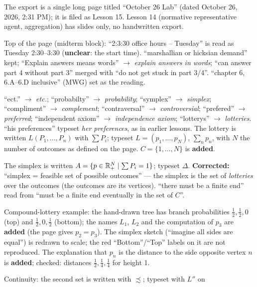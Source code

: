 \documentclass[11pt]{article}
\begin{document}
\begin{transcriptnotes}
  \item The export is a single long page titled ``October 26 Lab'' (dated October 26,
        2026, 2:31 PM); it is filed as Lesson 15. Lesson 14 (normative representative
        agent, aggregation) has slides only, no handwritten export.
  \item Top of the page (midterm block): ``2:3:30 office hours -- Tuesday'' is read as
        Tuesday 2:30--3:30 (\textbf{unclear}: the start time). ``marshallian or
        hicksian demand'' kept; ``Explain answers means words'' $\to$ \emph{explain
        answers in words}; ``can answer part 4 without part 3'' merged with ``do not
        get stuck in part 3/4''. ``chapter 6, 6.A--6.D inclusive'' (MWG) set as the
        reading.
  \item ``ect.'' $\to$ \emph{etc.}; ``probabilty'' $\to$ \emph{probability};
        ``symplex'' $\to$ \emph{simplex}; ``compliment'' $\to$ \emph{complement};
        ``contraversal'' $\to$ \emph{controversial}; ``prefered'' $\to$
        \emph{preferred}; ``independent axiom'' $\to$ \emph{independence axiom};
        ``lotterys'' $\to$ \emph{lotteries}. ``his preferences'' typeset
        \emph{her preferences}, as in earlier lessons. The lottery is written
        $L(P_1,\dots,P_n)$ with $\sum P_i$; typeset $L=(p_1,\dots,p_N)$, $\sum_n p_n$,
        with $N$ the number of outcomes as defined on the page. $C=\{1,\dots,N\}$ is
        \textbf{added}.
  \item The simplex is written $A=\{p\in\mathbb{R}^N_+\mid\sum P_i=1\}$; typeset $\Delta$.
        \textbf{Corrected:} ``simplex = feasible set of possible outcomes'' --- the
        simplex is the set of \emph{lotteries} over the outcomes (the outcomes are its
        vertices). ``there must be a finite end'' read from ``must be a finite end
        eventually in the set of $C$''.
  \item Compound-lottery example: the hand-drawn tree has branch probabilities
        $\tfrac12,\tfrac12,0$ (top) and $\tfrac12,0,\tfrac12$ (bottom); the names
        $L_1$, $L_2$ and the computation of $p_3$ are \textbf{added} (the page gives
        $p_2=p_3$). The simplex sketch (``imagine all sides are equal'') is redrawn to
        scale; the red ``Bottom''/``Top'' labels on it are not reproduced. The
        explanation that $p_n$ is the distance to the side opposite vertex $n$ is
        \textbf{added}; checked: distances $\tfrac12,\tfrac14,\tfrac14$ for height 1.
  \item Continuity: the second set is written with $\precsim$; typeset with $L''$ on

\end{transcriptnotes}
\end{document}
